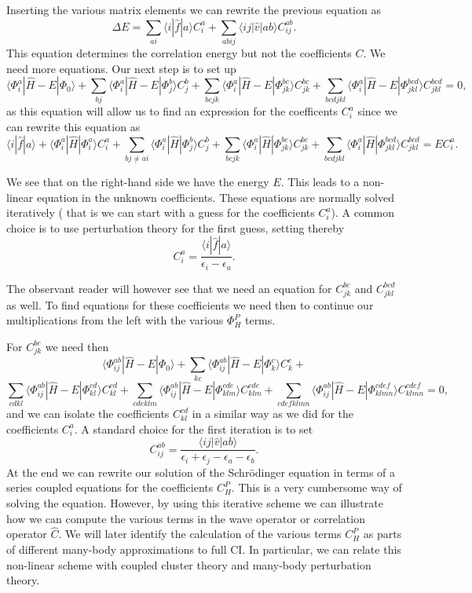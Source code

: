 Inserting the various matrix elements we can rewrite the previous equation as
\[
\Delta E=\sum_{ai}\langle i| \hat{f}|a \rangle C_{i}^{a}+
\sum_{abij}\langle ij | \hat{v}| ab \rangle C_{ij}^{ab}.
\]
This equation determines the correlation energy but not the coefficients $C$. 
We need more equations. Our next step is to set up
\[
\langle \Phi_i^a | \hat{H} -E| \Phi_0\rangle + \sum_{bj}\langle \Phi_i^a | \hat{H} -E|\Phi_{j}^{b} \rangle C_{j}^{b}+
\sum_{bcjk}\langle \Phi_i^a | \hat{H} -E|\Phi_{jk}^{bc} \rangle C_{jk}^{bc}+
\sum_{bcdjkl}\langle \Phi_i^a | \hat{H} -E|\Phi_{jkl}^{bcd} \rangle C_{jkl}^{bcd}=0,
\]
as this equation will allow us to find an expression for the coefficents $C_i^a$ since we can rewrite this equation as 
\[
\langle i | \hat{f}| a\rangle +\langle \Phi_i^a | \hat{H}|\Phi_{i}^{a} \rangle C_{i}^{a}+ \sum_{bj\ne ai}\langle \Phi_i^a | \hat{H}|\Phi_{j}^{b} \rangle C_{j}^{b}+
\sum_{bcjk}\langle \Phi_i^a | \hat{H}|\Phi_{jk}^{bc} \rangle C_{jk}^{bc}+
\sum_{bcdjkl}\langle \Phi_i^a | \hat{H}|\Phi_{jkl}^{bcd} \rangle C_{jkl}^{bcd}=EC_i^a.
\]

We see that on the right-hand side we have the energy $E$. This leads to a non-linear equation in the unknown coefficients. 
These equations are normally solved iteratively ( that is we can start with a guess for the coefficients $C_i^a$). A common choice is to use perturbation theory for the first guess, setting thereby
\[
 C_{i}^{a}=\frac{\langle i | \hat{f}| a\rangle}{\epsilon_i-\epsilon_a}.
\]

The observant reader will however see that we need an equation for $C_{jk}^{bc}$ and $C_{jkl}^{bcd}$ as well.
To find equations for these coefficients we need then to continue our multiplications from the left with the various
$\Phi_{H}^P$ terms. 


For $C_{jk}^{bc}$ we need then
\[
\langle \Phi_{ij}^{ab} | \hat{H} -E| \Phi_0\rangle + \sum_{kc}\langle \Phi_{ij}^{ab} | \hat{H} -E|\Phi_{k}^{c} \rangle C_{k}^{c}+
\]
\[
\sum_{cdkl}\langle \Phi_{ij}^{ab} | \hat{H} -E|\Phi_{kl}^{cd} \rangle C_{kl}^{cd}+\sum_{cdeklm}\langle \Phi_{ij}^{ab} | \hat{H} -E|\Phi_{klm}^{cde} \rangle C_{klm}^{cde}+\sum_{cdefklmn}\langle \Phi_{ij}^{ab} | \hat{H} -E|\Phi_{klmn}^{cdef} \rangle C_{klmn}^{cdef}=0,
\]
and we can isolate the coefficients $C_{kl}^{cd}$ in a similar way as we did for the coefficients $C_{i}^{a}$. 
A standard choice for the first iteration is to set 
\[
C_{ij}^{ab} =\frac{\langle ij \vert \hat{v} \vert ab \rangle}{\epsilon_i+\epsilon_j-\epsilon_a-\epsilon_b}.
\]
At the end we can rewrite our solution of the Schr\"odinger equation in terms of a series coupled equations for the coefficients $C_H^P$.
This is a very cumbersome way of solving the equation. However, by using this iterative scheme we can illustrate how we can compute the
various terms in the wave operator or correlation operator $\hat{C}$. We will later identify the calculation of the various terms $C_H^P$
as parts of different many-body approximations to full CI. In particular, we can  relate this non-linear scheme with coupled cluster theory and
many-body perturbation theory.


